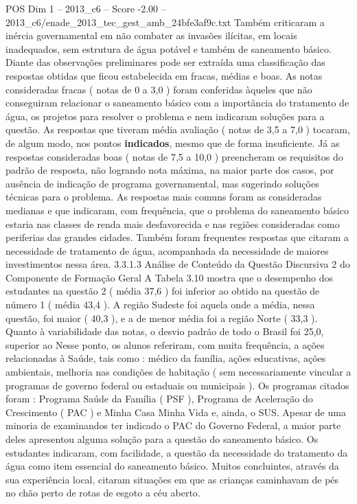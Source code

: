 \begin{textsample}{POS Dim 1 – 2013\_c6 – Score -2.00 – 2013\_c6/enade\_2013\_tec\_gest\_amb\_24bfe3af9c.txt}
Também criticaram a inércia governamental em não combater as invasões ilícitas, em locais inadequados, sem estrutura de água potável e também de saneamento básico.
Diante das observações preliminares pode ser extraída uma classificação das respostas obtidas que ficou estabelecida em fracas, médias e boas.
As notas consideradas fracas ( notas de 0 a 3,0 ) foram conferidas àqueles que não conseguiram relacionar o saneamento básico com a importância do tratamento de água, os projetos para resolver o problema e nem indicaram soluções para a questão.
As respostas que tiveram média avaliação ( notas de 3,5 a 7,0 ) tocaram, de algum modo, nos pontos \textbf{indicados}, mesmo que de forma insuficiente.
Já as respostas consideradas boas ( notas de 7,5 a 10,0 ) preencheram os requisitos do padrão de resposta, não logrando nota máxima, na maior parte dos casos, por ausência de indicação de programa governamental, mas sugerindo soluções técnicas para o problema.
As respostas mais comuns foram as consideradas medianas e que indicaram, com frequência, que o problema do saneamento básico estaria nas classes de renda mais desfavorecida e nas regiões consideradas como periferias das grandes cidades.
Também foram frequentes respostas que citaram a necessidade de tratamento de água, acompanhada da necessidade de maiores investimentos nessa área. 3.3.1.3 Análise de Conteúdo da Questão Discursiva 2 do Componente de Formação Geral A Tabela 3.10 mostra que o desempenho dos estudantes na questão 2 ( média 37,6 ) foi inferior ao obtido na questão de número 1 ( média 43,4 ).
A região Sudeste foi aquela onde a média, nessa questão, foi maior ( 40,3 ), e a de menor média foi a região Norte ( 33,3 ).
Quanto à variabilidade das notas, o desvio padrão de todo o Brasil foi 25,0, superior ao Nesse ponto, os alunos referiram, com muita frequência, a ações relacionadas à Saúde, tais como : médico da família, ações educativas, ações ambientais, melhoria nas condições de habitação ( sem necessariamente vincular a programas de governo federal ou estaduais ou municipais ).
Os programas citados foram : Programa Saúde da Família ( PSF ), Programa de Aceleração do Crescimento ( PAC ) e Minha Casa Minha Vida e, ainda, o SUS.
Apesar de uma minoria de examinandos ter indicado o PAC do Governo Federal, a maior parte deles apresentou alguma solução para a questão do saneamento básico.
Os estudantes indicaram, com facilidade, a questão da necessidade do tratamento da água como item essencial do saneamento básico.
Muitos concluintes, através da sua experiência local, citaram situações em que as crianças caminhavam de pés no chão perto de rotas de esgoto a céu aberto.

\end{textsample}
